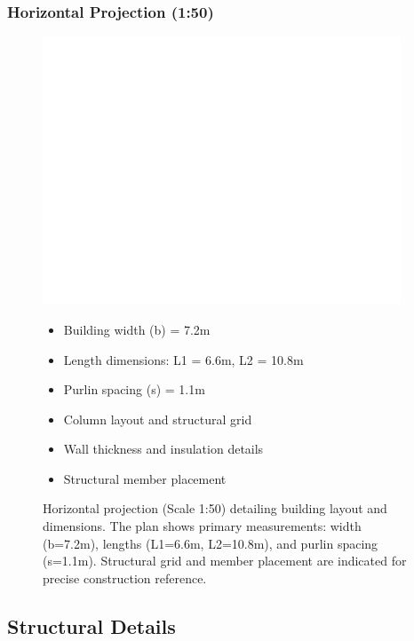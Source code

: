 \documentclass[12pt,a4paper]{article}
\begin{document}
\subsubsection{Horizontal Projection (1:50)}
\begin{figure}[H]
    \centering
    \includegraphics[width=0.95\textwidth]{cad_project/exports/screenshots/horizontal_projection.png}
    \caption{Horizontal projection (Scale 1:50) detailing building layout and dimensions.
    The plan shows primary measurements: width (b=7.2m), lengths (L1=6.6m, L2=10.8m), and purlin spacing (s=1.1m).
    Structural grid and member placement are indicated for precise construction reference.}

\begin{itemize}
    \item Building width (b) = 7.2m
    \item Length dimensions: L1 = 6.6m, L2 = 10.8m
    \item Purlin spacing (s) = 1.1m
    \item Column layout and structural grid
    \item Wall thickness and insulation details
    \item Structural member placement
\end{itemize}
    \label{fig:horizontal}
\end{figure}

\subsection{Structural Details}
\end{document}
